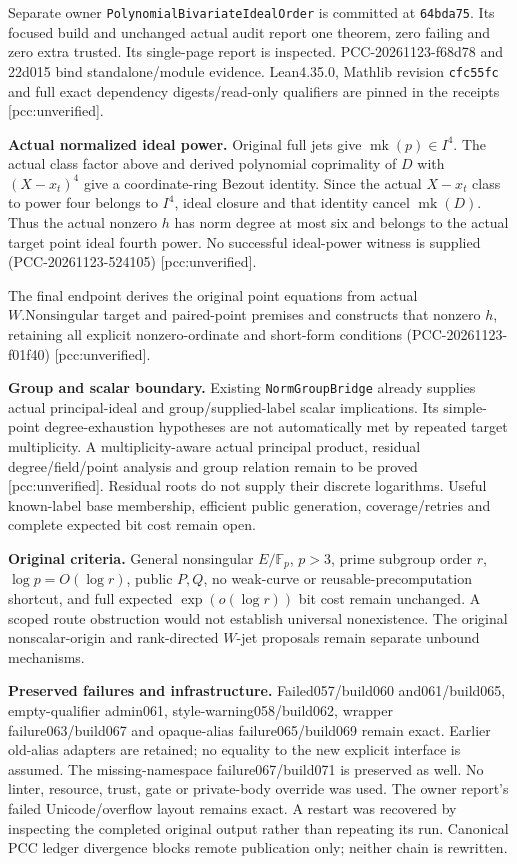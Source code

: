 \documentclass[11pt]{article}
\begin{document}
Separate owner \texttt{PolynomialBivariateIdealOrder} is committed at
\texttt{64bda75}. Its focused build and unchanged actual audit report one
theorem, zero failing and zero extra trusted. Its single-page report is
inspected. PCC-20261123-f68d78 and 22d015 bind standalone/module evidence.
Lean4.35.0, Mathlib revision \texttt{cfc55fc} and full exact dependency
digests/read-only qualifiers are pinned in the receipts [pcc:unverified].

\textbf{Actual normalized ideal power.}
Original full jets give \(\operatorname{mk}(p)\in I^4\).
The actual class factor above and derived polynomial coprimality of \(D\)
with \((X-x_t)^4\) give a coordinate-ring Bezout identity.
Since the actual \(X-x_t\) class to power four belongs to \(I^4\), ideal
closure and that identity cancel \(\operatorname{mk}(D)\).
Thus the actual nonzero \(h\) has norm degree at most six and belongs to
the actual target point ideal fourth power. No successful ideal-power
witness is supplied (PCC-20261123-524105) [pcc:unverified].

The final endpoint derives the original point equations from actual
\(W.\mathrm{Nonsingular}\) target and paired-point premises and constructs
that nonzero \(h\), retaining all explicit nonzero-ordinate and short-form
conditions (PCC-20261123-f01f40) [pcc:unverified].

\textbf{Group and scalar boundary.}
Existing \texttt{NormGroupBridge} already supplies actual principal-ideal
and group/supplied-label scalar implications.
Its simple-point degree-exhaustion hypotheses are not automatically met by
repeated target multiplicity. A multiplicity-aware actual principal product,
residual degree/field/point analysis and group relation remain to be proved [pcc:unverified].
Residual roots do not supply their discrete logarithms.
Useful known-label base membership, efficient public generation,
coverage/retries and complete expected bit cost remain open.

\textbf{Original criteria.}
General nonsingular \(E/\mathbb F_p\), \(p>3\), prime subgroup order \(r\),
\(\log p=O(\log r)\), public \(P,Q\), no weak-curve or reusable-precomputation
shortcut, and full expected \(\exp(o(\log r))\) bit cost remain unchanged.
A scoped route obstruction would not establish universal nonexistence.
The original nonscalar-origin and rank-directed \(W\)-jet proposals remain
separate unbound mechanisms.

\textbf{Preserved failures and infrastructure.}
Failed057/build060 and061/build065, empty-qualifier admin061,
style-warning058/build062, wrapper failure063/build067 and opaque-alias
failure065/build069 remain exact. Earlier old-alias adapters are retained;
no equality to the new explicit interface is assumed. The missing-namespace
failure067/build071 is preserved as well.
No linter, resource, trust, gate or private-body override was used.
The owner report's failed Unicode/overflow layout remains exact.
A restart was recovered by inspecting the completed original output rather
than repeating its run. Canonical PCC ledger divergence blocks remote
publication only; neither chain is rewritten.
\end{document}
